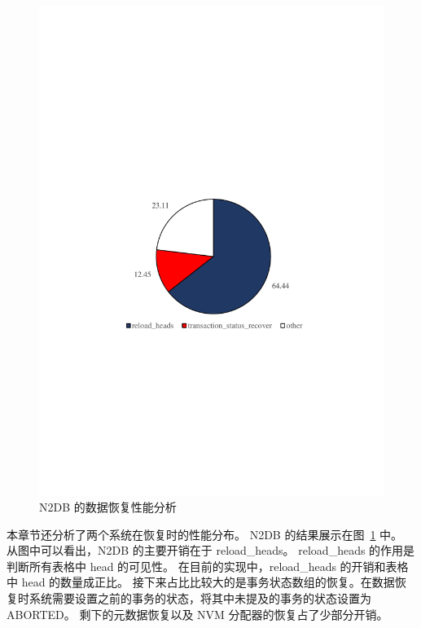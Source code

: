 \begin{figure}
    \centering
    \includegraphics[width=15cm, trim={1cm 9cm 1cm 10cm}]{figures/recovery_perf.pdf}
    \caption{N2DB 的数据恢复性能分析}
    \label{fig:recovery-n2db-perf}
\end{figure}

本章节还分析了两个系统在恢复时的性能分布。
N2DB 的结果展示在图~\ref{fig:recovery-n2db-perf} 中。
从图中可以看出，N2DB 的主要开销在于 reload\_heads。
reload\_heads 的作用是判断所有表格中 head 的可见性。
在目前的实现中，reload\_heads 的开销和表格中 head 的数量成正比。
接下来占比比较大的是事务状态数组的恢复。在数据恢复时系统需要设置之前的事务的状态，将其中未提及的事务的状态设置为 ABORTED。
剩下的元数据恢复以及 NVM 分配器的恢复占了少部分开销。

